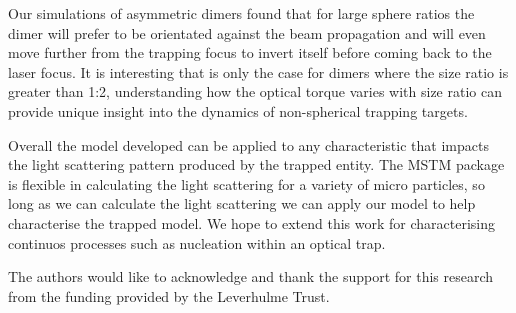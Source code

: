 \documentclass[final,3p, twocolumn]{elsarticle}
\begin{document}
Our simulations of asymmetric dimers found that for large sphere ratios the dimer will prefer to be orientated against the beam propagation and will even move further from the trapping focus to invert itself before coming back to the laser focus. It is interesting that is only the case for dimers where the size ratio is greater than 1:2, understanding how the optical torque varies with size ratio can provide unique insight into the dynamics of non-spherical trapping targets.  

Overall the model developed can be applied to any characteristic that impacts the light scattering pattern produced by the trapped entity. The MSTM package is flexible in  calculating the light scattering for a variety of micro particles, so long as we can calculate the light scattering we can apply our model to help characterise the trapped model. We hope to extend this work for characterising continuos processes such as nucleation within an optical trap.  

The authors would like to acknowledge and thank the support for this research from the funding provided by the Leverhulme Trust.  

 

\end{document}
